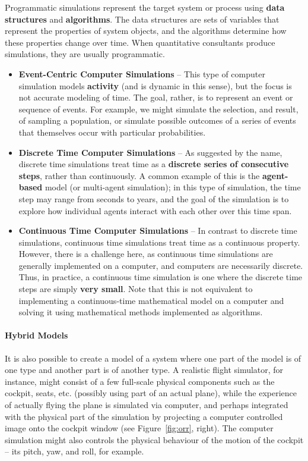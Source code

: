 Programmatic simulations represent the target system or process using \textbf{data structures} and \textbf{algorithms}. The data structures are sets of variables that represent the properties of system objects, and the algorithms determine how these properties change over time. When quantitative consultants produce simulations, they are usually programmatic. 
\vfill
\begin{itemize}[noitemsep]
\item\textbf{Event-Centric Computer Simulations} -- This type of computer simulation models \textbf{activity} (and is dynamic in this sense), but the focus is not accurate modeling of time. The goal, rather, is to represent an event or sequence of events. For example, we might simulate the selection, and result, of sampling a population, or simulate possible outcomes of a series of events that themselves occur with particular probabilities.

\item \textbf{Discrete Time Computer Simulations} -- As suggested by the name, discrete time simulations treat time as a \textbf{discrete series of consecutive steps}, rather than continuously. A common example of this is the \textbf{agent-based} model (or multi-agent simulation); in this type of simulation, the time step may range from seconds to years, and the goal of the simulation is to explore how individual agents interact with each other over this time span.

\item \textbf{Continuous Time Computer Simulations} -- In contrast to discrete time simulations, continuous time simulations treat time as a continuous property. However, there is a challenge here, as continuous time simulations are generally implemented on a computer, and computers are necessarily discrete. Thus, in practice, a continuous time simulation is one where the discrete time steps are simply \textbf{very small}. Note  that this is not equivalent to implementing a continuous-time mathematical model on a computer and solving it using mathematical methods implemented as algorithms.
\end{itemize}
\paragraph{Hybrid Models}
It is also possible to create a model of a system where one part of the model is of one type and another part is of another type. A realistic flight simulator, for instance, might consist of a few full-scale physical components such as the cockpit, seats, etc. (possibly using part of an actual plane), while the experience of actually flying the plane is simulated via computer, and perhaps integrated with the physical part of the simulation by projecting a computer controlled image onto the cockpit window (see Figure~\ref{fig:orr}, right). The computer simulation might also controls the physical behaviour of the motion of the cockpit -- its pitch, yaw, and roll, for example.
